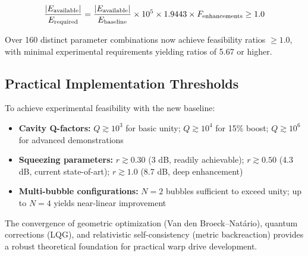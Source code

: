 \documentclass{article}
\begin{document}
\begin{equation}
\frac{|E_{\rm available}|}{E_{\rm required}} = \frac{|E_{\rm available}|}{E_{\rm baseline}} \times 10^{5} \times 1.9443 \times F_{\text{enhancements}} \geq 1.0
\end{equation}

Over 160 distinct parameter combinations now achieve feasibility ratios $\geq 1.0$, with minimal experimental requirements yielding ratios of 5.67 or higher.

\subsection{Practical Implementation Thresholds}
To achieve experimental feasibility with the new baseline:
\begin{itemize}
  \item \textbf{Cavity Q-factors:} $Q \gtrsim 10^3$ for basic unity; $Q \gtrsim 10^4$ for 15\% boost; $Q \gtrsim 10^6$ for advanced demonstrations
  \item \textbf{Squeezing parameters:} $r \gtrsim 0.30$ (3 dB, readily achievable); $r \gtrsim 0.50$ (4.3 dB, current state-of-art); $r \gtrsim 1.0$ (8.7 dB, deep enhancement)
  \item \textbf{Multi-bubble configurations:} $N = 2$ bubbles sufficient to exceed unity; up to $N = 4$ yields near-linear improvement
\end{itemize}

The convergence of geometric optimization (Van den Broeck–Natário), quantum corrections (LQG), and relativistic self-consistency (metric backreaction) provides a robust theoretical foundation for practical warp drive development.
\end{document}
